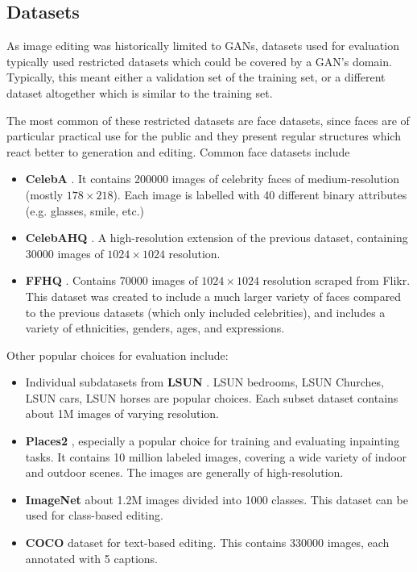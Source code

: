\subsection{Datasets}

As image editing was historically limited to \ac{GAN}s, datasets used 
for evaluation typically used restricted datasets which could be covered by 
a \ac{GAN}'s domain. Typically, this meant either a validation set of the training 
set, or a different dataset altogether which is similar to the training set.

The most common of these restricted datasets are face datasets, since faces are 
of particular practical use for the public and they present regular structures which 
react better to generation and editing. Common face datasets
include

\begin{itemize}
      \item \textbf{CelebA} \citep{celeba}. It contains 200000 images of celebrity faces of medium-resolution (mostly $178\times218$). Each image is labelled with 40 different binary attributes (e.g. glasses, smile, etc.)
      \item \textbf{CelebAHQ} \citep{karras2018progressive}. A high-resolution extension of the previous dataset, containing 30000 images of $1024\times1024$ resolution.
      \item \textbf{FFHQ} \citep{karra2019stylegan}. Contains 70000 images of $1024\times1024$ resolution scraped from Flikr. This dataset was created to include a much larger variety of faces compared to the previous datasets (which only included celebrities), and includes a variety of ethnicities, genders, ages, and expressions.
\end{itemize} 

Other popular choices for evaluation  include:

\begin{itemize}
      \item Individual subdatasets from \textbf{LSUN} \citep{lsun}. LSUN bedrooms, LSUN Churches, LSUN cars, LSUN horses are popular choices. Each subset dataset contains about 1M images of varying resolution. 
      \item \textbf{Places2} \citep{zhou2017places}, especially a popular choice for training and evaluating inpainting tasks. It contains 10 million labeled images, covering a wide variety of indoor and outdoor scenes. The images are generally of high-resolution.
      \item \textbf{ImageNet} \citep{russakovsky2015imagenet_ilsvrc} about 1.2M images divided into 1000 classes. This dataset can be used for class-based editing.
      \item \textbf{COCO} dataset \citep{caesar2018cocoostuff} for text-based editing. This contains 330000 images, each annotated with 5 captions. 
\end{itemize}

